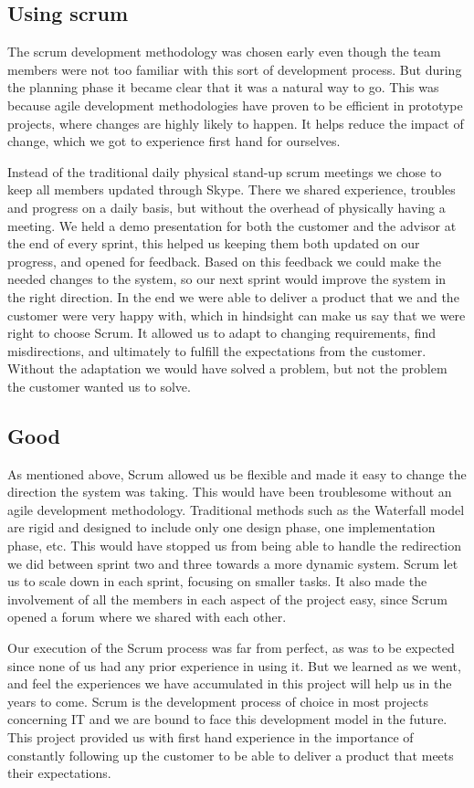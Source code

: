 \subsection*{Using scrum}
The scrum development methodology was chosen early even though the team members were not too familiar with this sort of development process. But during the planning phase it became clear that it was a natural way to go. This was because agile development methodologies have proven to be efficient in prototype projects, where changes are highly likely to happen. It helps reduce the impact of change, which we got to experience first hand for ourselves. 

Instead of the traditional daily physical stand-up scrum meetings we chose to keep all members updated through Skype. There we shared experience, troubles and progress on a daily basis, but without the overhead of physically having a meeting. We held a demo presentation for both the customer and the advisor at the end of every sprint, this helped us keeping them both updated on our progress, and opened for feedback. Based on this feedback we could make the needed changes to the system, so our next sprint would improve the system in the right direction. In the end we were able to deliver a product that we and the customer were very happy with, which in hindsight can make us say that we were right to choose Scrum. It allowed us to adapt to changing requirements, find misdirections, and ultimately to fulfill the expectations from the customer. Without the adaptation we would have solved a problem, but not the problem the customer wanted us to solve.

\subsection*{Good}
As mentioned above, Scrum allowed us be flexible and made it easy to change the direction the system was taking. This would have been troublesome without an agile development methodology. Traditional methods such as the Waterfall model are rigid and designed to include only one design phase, one implementation phase, etc. This would have stopped us from being able to handle the redirection we did between sprint two and three towards a more dynamic system. Scrum let us to scale down in each sprint, focusing on smaller tasks. It also made the involvement of all the members in each aspect of the project easy, since Scrum opened a forum where we shared with each other. 

Our execution of the Scrum process was far from perfect, as was to be expected since none of us had any prior experience in using it. But we learned as we went, and feel the experiences we have accumulated in this project will help us in the years to come. Scrum is the development process of choice in most projects concerning IT and we are bound to face this development model in the future. This project provided us with first hand experience in the importance of constantly following up the customer to be able to deliver a product that meets their expectations.

